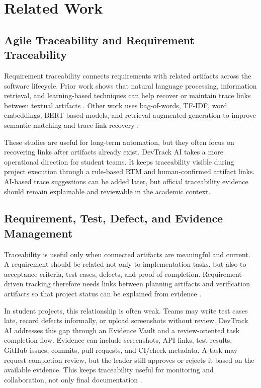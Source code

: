 \section{Related Work}

\subsection{Agile Traceability and Requirement Traceability}

Requirement traceability connects requirements with related artifacts across the
software lifecycle. Prior work shows that natural language processing, information
retrieval, and learning-based techniques can help recover or maintain trace links
between textual artifacts \cite{nlpTraceability,crossLevelTraceability}. Other work
uses bag-of-words, TF-IDF, word embeddings, BERT-based models, and retrieval-augmented
generation to improve semantic matching and trace link recovery
\cite{crossLevelTraceability,traceBert,ragTraceability}.

These studies are useful for long-term automation, but they often focus on recovering
links after artifacts already exist. DevTrack AI takes a more operational direction
for student teams. It keeps traceability visible during project execution through a
rule-based RTM and human-confirmed artifact links. AI-based trace suggestions can be
added later, but official traceability evidence should remain explainable and
reviewable in the academic context.

\subsection{Requirement, Test, Defect, and Evidence Management}

Traceability is useful only when connected artifacts are meaningful and current. A
requirement should be related not only to implementation tasks, but also to acceptance
criteria, test cases, defects, and proof of completion. Requirement-driven tracking
therefore needs links between planning artifacts and verification artifacts so that
project status can be explained from evidence \cite{nlpTraceability,crossLevelTraceability}.

In student projects, this relationship is often weak. Teams may write test cases
late, record defects informally, or upload screenshots without review. DevTrack AI
addresses this gap through an Evidence Vault and a review-oriented task completion
flow. Evidence can include screenshots, API links, test results, GitHub issues,
commits, pull requests, and CI/check metadata. A task may request completion review,
but the leader still approves or rejects it based on the available evidence. This
keeps traceability useful for monitoring and collaboration, not only final
documentation \cite{ragTraceability}.

